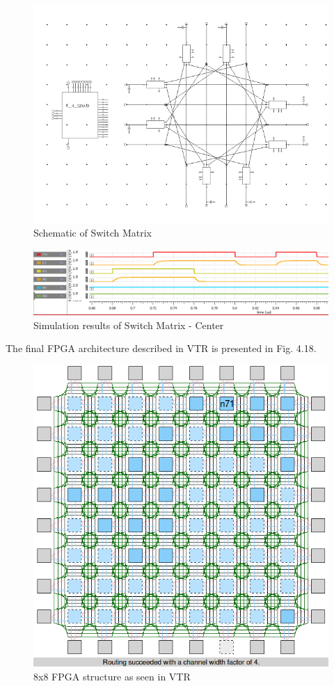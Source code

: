\begin{figure}[H]
\centering
\includegraphics[scale=0.58]{sm.png}
\caption{Schematic of Switch Matrix}
\label{fig:Figure}
\end{figure}
\begin{figure}[H]
\centering
\includegraphics[width=\textwidth]{smsimulation.png}
\caption{Simulation results of Switch Matrix - Center}
\label{fig:Figure}
\end{figure}

The final FPGA architecture described in VTR is presented in Fig. 4.18.

\begin{figure}[H]
\centering
\includegraphics[scale=0.65]{BTP_work/8x8_FPGA.png}
\caption{8x8 FPGA structure as seen in VTR}
\label{fig:Figure}
\end{figure}


